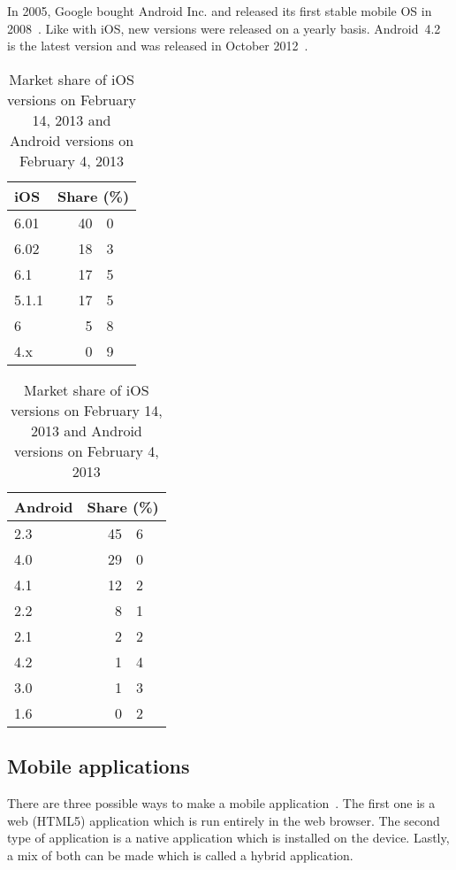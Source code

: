 \documentclass[a4paper]{artikel3}
\renewcommand{\paragraph}[1]{\vspace{2mm} \noindent {\bf #1}  }
\begin{document}
\paragraph{Android}
In 2005, Google bought Android Inc. and released its first stable mobile OS in 2008~\cite{Satyesh2012}.
Like with iOS, new versions were released on a yearly basis.
Android~4.2 is the latest version and was released in October 2012~\cite{Sawers2012}.

\begin{table}[h!]
\centering

\begin{tabular}[b]{l r@{.}l}
\toprule
iOS    	& \multicolumn{2}{c}{Share (\%)} \\
\midrule
6.01		& 40 & 0 \\
6.02		& 18 & 3 \\
6.1		& 17 & 5	\\
5.1.1	& 17 & 5 \\
6		& 5 & 8 \\
4.x		& 0 & 9 \\
\bottomrule
\end{tabular}
\quad
\begin{tabular}[b]{l r@{.}l}
\toprule
Android	& \multicolumn{2}{c}{Share (\%)} \\
\midrule
2.3		& 45 & 6 \\
4.0		& 29 & 0 \\
4.1		& 12 & 2 \\
2.2		& 8 & 1 \\
2.1		& 2 & 2 \\
4.2		& 1 & 4 \\
3.0		& 1 & 3 \\
1.6 		& 0 & 2 \\
\bottomrule
\end{tabular}
\caption{Market share of iOS versions on February 14, 2013 and Android versions on February 4, 2013 \protect\cite{Sylvain2013,Android2013}}
\label{table:ios-versions}
\end{table}

\subsection{Mobile applications}
There are three possible ways to make a mobile application~\cite{Accenture2012,Hales2012}.
The first one is a web (HTML5) application which is run entirely in the web browser.
The second type of application is a native application which is installed on the device.
Lastly, a mix of both can be made which is called a hybrid application.
\end{document}
